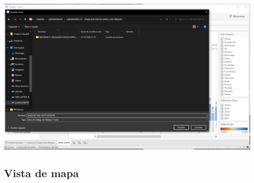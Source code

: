 \documentclass[12pt,letterpaper]{article}
\newcommand\tab[1][1cm]{\hspace*{#1}}
\begin{document}
\begin{enumerate}[\tab 1.]
\begin{center}
            \includegraphics[width=15cm]{./img/img31.png}
        \end{center}
    \end{enumerate}
    \subsection{Vista de mapa}
\end{document}
